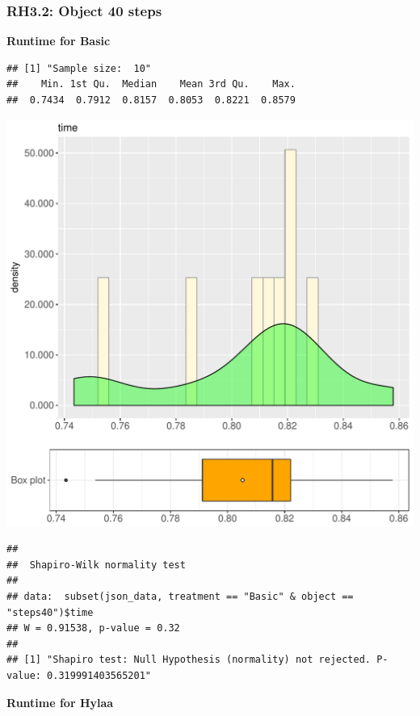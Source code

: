 \documentclass{article}\usepackage[]{graphicx}\usepackage[]{color}
\makeatletter
\def\maxwidth{ %
  \ifdim\Gin@nat@width>\linewidth
    \linewidth
  \else
    \Gin@nat@width
  \fi
}
\newenvironment{kframe}{%
 \def\at@end@of@kframe{}%
 \ifinner\ifhmode%
  \def\at@end@of@kframe{\end{minipage}}%
  \begin{minipage}{\columnwidth}%
 \fi\fi%
 \def\FrameCommand##1{\hskip\@totalleftmargin \hskip-\fboxsep
 \colorbox{shadecolor}{##1}\hskip-\fboxsep
     \hskip-\linewidth \hskip-\@totalleftmargin \hskip\columnwidth}%
 \MakeFramed {\advance\hsize-\width
   \@totalleftmargin\z@ \linewidth\hsize
   \@setminipage}}%
 {\par\unskip\endMakeFramed%
 \at@end@of@kframe}
\newenvironment{knitrout}{}{} %
\makeatother
\begin{document}
\subsubsection{RH3.2: Object 40 steps}

 \textbf{Runtime for Basic}
\begin{knitrout}
\color{fgcolor}\begin{kframe}
\begin{verbatim}
## [1] "Sample size:  10"
##    Min. 1st Qu.  Median    Mean 3rd Qu.    Max. 
##  0.7434  0.7912  0.8157  0.8053  0.8221  0.8579
\end{verbatim}
\end{kframe}
\includegraphics[width=\maxwidth]{figure/RH3_Basic_steps40-1} 
\begin{kframe}\begin{verbatim}
## 
## 	Shapiro-Wilk normality test
## 
## data:  subset(json_data, treatment == "Basic" & object == "steps40")$time
## W = 0.91538, p-value = 0.32
## 
## [1] "Shapiro test: Null Hypothesis (normality) not rejected. P-value: 0.319991403565201"
\end{verbatim}
\end{kframe}
\end{knitrout}
 \textbf{Runtime for Hylaa}
\end{document}

